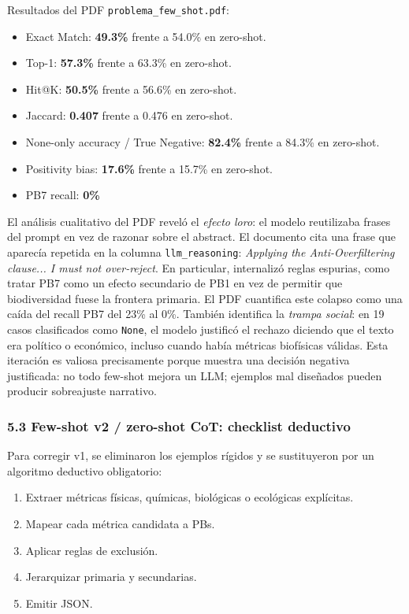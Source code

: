 Resultados del PDF \texttt{problema\_few\_shot.pdf}:

\begin{itemize}
\item Exact Match: \textbf{49.3\%} frente a 54.0\% en zero-shot.
\item Top-1: \textbf{57.3\%} frente a 63.3\% en zero-shot.
\item Hit@K: \textbf{50.5\%} frente a 56.6\% en zero-shot.
\item Jaccard: \textbf{0.407} frente a 0.476 en zero-shot.
\item None-only accuracy / True Negative: \textbf{82.4\%} frente a 84.3\% en zero-shot.
\item Positivity bias: \textbf{17.6\%} frente a 15.7\% en zero-shot.
\item PB7 recall: \textbf{0\%}
\end{itemize}

El análisis cualitativo del PDF reveló el \emph{efecto loro}: el modelo reutilizaba frases del prompt en vez de razonar sobre el abstract. El documento cita una frase que aparecía repetida en la columna \texttt{llm\_reasoning}: \emph{Applying the Anti-Overfiltering clause... I must not over-reject}. En particular, internalizó reglas espurias, como tratar PB7 como un efecto secundario de PB1 en vez de permitir que biodiversidad fuese la frontera primaria. El PDF cuantifica este colapso como una caída del recall PB7 del 23\% al 0\%. También identifica la \emph{trampa social}: en 19 casos clasificados como \texttt{None}, el modelo justificó el rechazo diciendo que el texto era político o económico, incluso cuando había métricas biofísicas válidas. Esta iteración es valiosa precisamente porque muestra una decisión negativa justificada: no todo few-shot mejora un LLM; ejemplos mal diseñados pueden producir sobreajuste narrativo.

\subsubsection{5.3 Few-shot v2 / zero-shot CoT: checklist deductivo}

Para corregir v1, se eliminaron los ejemplos rígidos y se sustituyeron por un algoritmo deductivo obligatorio:

\begin{enumerate}
\item Extraer métricas físicas, químicas, biológicas o ecológicas explícitas.
\item Mapear cada métrica candidata a PBs.
\item Aplicar reglas de exclusión.
\item Jerarquizar primaria y secundarias.
\item Emitir JSON.
\end{enumerate}

